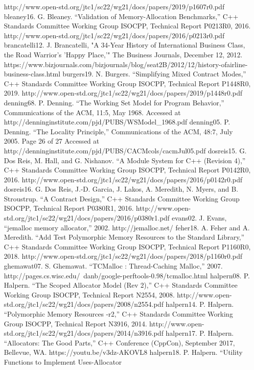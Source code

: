 http://www.open-std.org/jtc1/sc22/wg21/docs/papers/2019/p1607r0.pdf
bleaney16. G. Bleaney. “Validation of Memory-Allocation Benchmarks,” C++
Standards Committee Working Group ISOCPP, Technical Report P0213R0,
2016.
http://www.open-std.org/jtc1/sc22/wg21/docs/papers/2016/p0213r0.pdf
brancatelli12. J. Brancatelli, "A 34-Year History of International Business Class,
the Road Warrior's 'Happy Place,'" The Business Journals, December 12, 2012.
https://www.bizjournals.com/bizjournals/blog/seat2B/2012/12/history-ofairline-business-class.html
burgers19. N. Burgers. “Simplifying Mixed Contract Modes,” C++ Standards
Committee Working Group ISOCPP, Technical Report P1448R0, 2019.
http://www.open-std.org/jtc1/sc22/wg21/docs/papers/2019/p1448r0.pdf
denning68. P. Denning. “The Working Set Model for Program Behavior,”
Communications of the ACM, 11:5, May 1968.
Accessed at http://denninginstitute.com/pjd/PUBS/WSModel_1968.pdf
denning05. P. Denning. “The Locality Principle,” Communications of the ACM, 48:7,
July 2005. 
Page 26 of 27
Accessed at
http://denninginstitute.com/pjd/PUBS/CACMcols/cacmJul05.pdf
dosreis15. G. Dos Reis, M. Hall, and G. Nishanov. “A Module System for C++
(Revision 4),” C++ Standards Committee Working Group ISOCPP, Technical
Report P0142R0, 2016.
http://www.open-std.org/jtc1/sc22/wg21/docs/papers/2016/p0142r0.pdf
dosreis16. G. Dos Reis, J.-D. Garcia, J. Lakos, A. Meredith, N. Myers, and B.
Stroustrup. “A Contract Design,” C++ Standards Committee Working Group
ISOCPP, Technical Report P0380R1, 2016.
http://www.open-std.org/jtc1/sc22/wg21/docs/papers/2016/p0380r1.pdf
evans02. J. Evans, “jemalloc memory allocator,” 2002.
http://jemalloc.net/
feher18. A. Feher and A. Meredith. “Add Test Polymorphic Memory Resources to the
Standard Library,” C++ Standards Committee Working Group ISOCPP,
Technical Report P1160R0, 2018.
http://www.open-std.org/jtc1/sc22/wg21/docs/papers/2018/p1160r0.pdf
ghemawat07. S. Ghemawat. “TCMalloc : Thread-Caching Malloc,” 2007.
http://pages.cs.wisc.edu/~danb/google-perftools-0.98/tcmalloc.html
halpern08. P. Halpern. “The Scoped Allocator Model (Rev 2),” C++ Standards
Committee Working Group ISOCPP, Technical Report N2554, 2008.
http://www.open-std.org/jtc1/sc22/wg21/docs/papers/2008/n2554.pdf
halpern14. P. Halpern. “Polymorphic Memory Resources -r2,” C++ Standards
Committee Working Group ISOCPP, Technical Report N3916, 2014.
http://www.open-std.org/jtc1/sc22/wg21/docs/papers/2014/n3916.pdf
halpern17. P. Halpern. “Allocators: The Good Parts,” C++ Conference (CppCon),
September 2017, Bellevue, WA.
https://youtu.be/v3dz-AKOVL8
halpern18. P. Halpern. “Utility Functions to Implement Uses-Allocator
